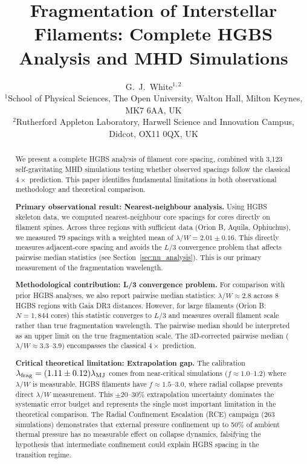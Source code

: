 \documentclass[twocolumn,usenatbib]{mnras}
\title{Fragmentation of Interstellar Filaments: Complete HGBS Analysis and MHD Simulations}
\author[G.~J.~White]{G.~J.~White$^{1,2}$\\
$^{1}$School of Physical Sciences, The Open University, Walton Hall, Milton Keynes, MK7 6AA, UK\\
$^{2}$Rutherford Appleton Laboratory, Harwell Science and Innovation Campus, Didcot, OX11 0QX, UK}
\begin{document}
\maketitle

\begin{abstract}
We present a complete HGBS analysis of filament core spacing, combined with 3,123 self-gravitating MHD simulations testing whether observed spacings follow the classical $4\times$ prediction. This paper identifies fundamental limitations in both observational methodology and theoretical comparison.

\textbf{Primary observational result: Nearest-neighbour analysis.}
Using HGBS skeleton data, we computed nearest-neighbour core spacings for cores directly on filament spines. Across three regions with sufficient data (Orion B, Aquila, Ophiuchus), we measured 79 spacings with a weighted mean of $\lambda/W = 2.01 \pm 0.16$. This directly measures adjacent-core spacing and avoids the $L/3$ convergence problem that affects pairwise median statistics (see Section~\ref{sec:nn_analysis}). This is our primary measurement of the fragmentation wavelength.

\noindent\textbf{Methodological contribution: L/3 convergence problem.}
For comparison with prior HGBS analyses, we also report pairwise median statistics: $\lambda/W \approx 2.8$ across 8 HGBS regions with Gaia DR3 distances. However, for large filaments (Orion B: $N = 1,844$ cores) this statistic converges to $L/3$ and measures overall filament scale rather than true fragmentation wavelength. The pairwise median should be interpreted as an upper limit on the true fragmentation scale. The 3D-corrected pairwise median ($\lambda/W \approx 3.3$--$3.9$) encompasses the classical $4\times$ prediction.

\noindent\textbf{Critical theoretical limitation: Extrapolation gap.}
The calibration $\lambda_{\rm frag} = (1.11 \pm 0.12)\lambda_{\rm MJ}$ comes from near-critical simulations ($f \approx 1.0$--$1.2$) where $\lambda/W$ is measurable. HGBS filaments have $f \approx 1.5$--$3.0$, where radial collapse prevents direct $\lambda/W$ measurement. This $\pm 20$--$30\%$ extrapolation uncertainty dominates the systematic error budget and represents the single most important limitation in the theoretical comparison. The Radial Confinement Escalation (RCE) campaign (263 simulations) demonstrates that external pressure confinement up to 50\% of ambient thermal pressure has no measurable effect on collapse dynamics, falsifying the hypothesis that intermediate confinement could explain HGBS spacing in the transition regime.


\end{abstract}
\end{document}
